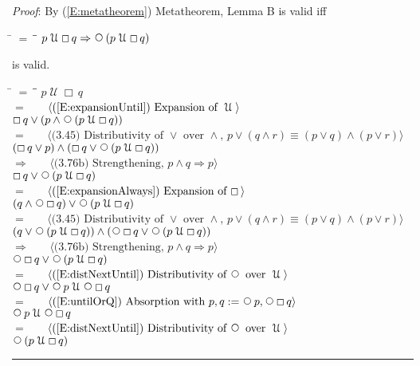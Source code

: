 \documentclass[12pt, fleqn, leqno]{article}
\newcommand{\lgap}{2pt}                             %
\newcommand{\mymathindent}{24pt}                    %
\newcommand{\impl}{\ensuremath{\Rightarrow}}        %
\newcommand{\Until}{\;\mathcal{U}\;}
\newcommand{\Next}{\;\,\text{\raisebox{3.5pt}{\circle{6}}}}
\newcommand{\Always}{\Box\,}
\newcommand{\myqed}{\rule[-.23ex]{1.2ex}{2.0ex}}
\newcommand{\myqedtab}{\hspace{384pt}}              %
\newcommand{\Gll} {\langle}                         %
\newcommand{\Ggg} {\rangle}                         %
\newcommand{\Hint}[1]     {\ \ \ $\Gll              \mbox{#1} \Ggg$ }   %
\begin{document}
\emph{Proof}: By (\ref{E:metatheorem}) Metatheorem, Lemma B is valid iff
\begin{tabbing}
\hspace{\mymathindent} \= $= \;$ \= \myqedtab \= \kill
\> \> $p \Until \Always q \impl \Next (p \Until \Always q)$
\end{tabbing}
is valid.
\begin{tabbing}
\hspace{\mymathindent} \= $= \;$ \= \myqedtab \= \kill
  \> \>   $p \Until \Always q$\\[\lgap]
   \> $=$  \>  \Hint{(\ref{E:expansionUntil}) Expansion of $\Until$}\\[\lgap]
  \> \>   $\Always q \lor (p \land \Next(p \Until \Always q))$\\[\lgap]
  \> $=$ \> \Hint{(3.45) Distributivity of $\lor$ over $\land$, $p\lor (q\land r) \equiv (p\lor q) \land (p\lor r)$} \\[\lgap]
\> \> $(\Always q\lor p) \land (\Always q\lor \Next (p \Until \Always q))$\\[\lgap]
\> $\impl$ \> \Hint{(3.76b) Strengthening, $p\land q \impl p$} \\[\lgap]
\> \> $\Always q \lor \Next (p \Until \Always q)$\\[\lgap]
\> $=$  \>  \Hint{(\ref{E:expansionAlways}) Expansion of $\Always$}\\[\lgap]
\> \> $(q \land \Next \Always q) \lor \Next (p \Until \Always q)$\\[\lgap]
\> $=$ \> \Hint{(3.45) Distributivity of $\lor$ over $\land$, $p\lor (q\land r) \equiv (p\lor q) \land (p\lor r)$} \\[\lgap]
\> \> $(q \lor  \Next (p \Until \Always q)) \land (\Next \Always q \lor  \Next (p \Until \Always q))$\\[\lgap]
\> $\impl$ \> \Hint{(3.76b) Strengthening, $p\land q \impl p$} \\[\lgap]
\> \> $ \Next \Always q \lor  \Next (p \Until \Always q)$\\[\lgap]
\> $=$  \>  \Hint{(\ref{E:distNextUntil}) Distributivity of $\Next$ over $\Until$}\\[\lgap]
\> \> $ \Next \Always q \lor  \Next p \Until \Next \Always q$\\[\lgap]
\> $=$ \> \Hint{(\ref{E:untilOrQ}) Absorption with $p,q := \Next p, \Next \Always q$} \\[\lgap]
\> \> $ \Next p \Until \Next \Always q$\\[\lgap]
\> $=$  \>  \Hint{(\ref{E:distNextUntil}) Distributivity of $\Next$ over $\Until$}\\[\lgap]
\> \> $ \Next (p \Until \Always q)$ \quad \myqed
\end{tabbing}
\end{document}

